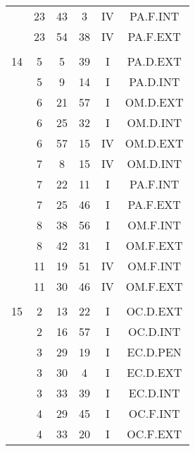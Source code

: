 \documentclass[12pt, a4paper]{article}
\begin{document}
\begin{multicols}{3}
{\begin{tabular}{c c c c c c}
	 	 	 	 & 23 & 43 & 3 & IV & PA.F.INT\\%
	 	 	 	 & 23 & 54 & 38 & IV & PA.F.EXT\\%
	 	 	 	 & & & & & \\%
	 	 	 	14 & 5 & 5 & 39 & I & PA.D.EXT\\%
	 	 	 	 & 5 & 9 & 14 & I & PA.D.INT\\%
	 	 	 	 & 6 & 21 & 57 & I & OM.D.EXT\\%
	 	 	 	 & 6 & 25 & 32 & I & OM.D.INT\\%
	 	 	 	 & 6 & 57 & 15 & IV & OM.D.EXT\\%
	 	 	 	 & 7 & 8 & 15 & IV & OM.D.INT\\%
	 	 	 	 & 7 & 22 & 11 & I & PA.F.INT\\%
	 	 	 	 & 7 & 25 & 46 & I & PA.F.EXT\\%
	 	 	 	 & 8 & 38 & 56 & I & OM.F.INT\\%
	 	 	 	 & 8 & 42 & 31 & I & OM.F.EXT\\%
	 	 	 	 & 11 & 19 & 51 & IV & OM.F.INT\\%
	 	 	 	 & 11 & 30 & 46 & IV & OM.F.EXT\\%
	 	 	 	 & & & & & \\%
	 	 	 	15 & 2 & 13 & 22 & I & OC.D.EXT\\%
	 	 	 	 & 2 & 16 & 57 & I & OC.D.INT\\%
	 	 	 	 & 3 & 29 & 19 & I & EC.D.PEN\\%
	 	 	 	 & 3 & 30 & 4 & I & EC.D.EXT\\%
	 	 	 	 & 3 & 33 & 39 & I & EC.D.INT\\%
	 	 	 	 & 4 & 29 & 45 & I & OC.F.INT\\%
	 	 	 	 & 4 & 33 & 20 & I & OC.F.EXT\\%

\end{tabular}}
\end{multicols}
\end{document}
